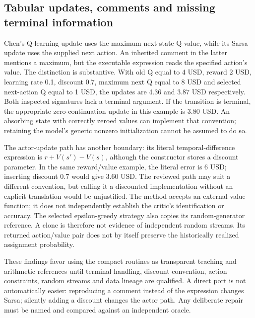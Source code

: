 \subsection{Tabular updates, comments and missing terminal information}
Chen's Q-learning update uses the maximum next-state Q value, while its Sarsa update uses the supplied next action. An inherited comment in the latter mentions a maximum, but the executable expression reads the specified action's value. The distinction is substantive. With old Q equal to 4 USD, reward 2 USD, learning rate 0.1, discount 0.7, maximum next Q equal to 8 USD and selected next-action Q equal to 1 USD, the updates are 4.36 and 3.87 USD respectively. Both inspected signatures lack a terminal argument. If the transition is terminal, the appropriate zero-continuation update in this example is 3.80 USD. An absorbing state with correctly zeroed values can implement that convention; retaining the model's generic nonzero initialization cannot be assumed to do so.\citep{exec24_policyjava_chen,exec24_policyjava_comparison}

The actor-update path has another boundary: its literal temporal-difference expression is $r+V(s')-V(s)$, although the constructor stores a discount parameter. In the same reward/value example, the literal error is 6 USD; inserting discount 0.7 would give 3.60 USD. The reviewed path may suit a different convention, but calling it a discounted implementation without an explicit translation would be unjustified. The method accepts an external value function; it does not independently establish the critic's identification or accuracy. The selected epsilon-greedy strategy also copies its random-generator reference. A clone is therefore not evidence of independent random streams. Its returned action/value pair does not by itself preserve the historically realized assignment probability.\citep{exec24_policyjava_chen,exec24_policyjava_comparison}

These findings favor using the compact routines as transparent teaching and arithmetic references until terminal handling, discount convention, action constraints, random streams and data lineage are qualified. A direct port is not automatically easier: reproducing a comment instead of the expression changes Sarsa; silently adding a discount changes the actor path. Any deliberate repair must be named and compared against an independent oracle.


